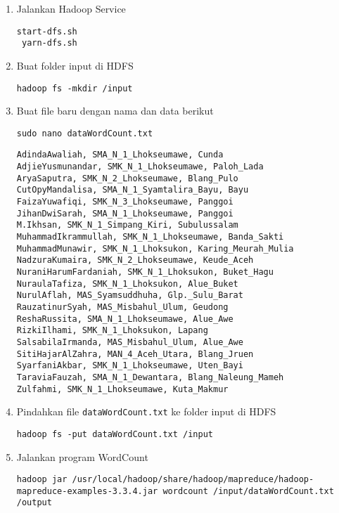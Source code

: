 \documentclass[a4paper]{tufte-handout}
\begin{document}
\begin{enumerate}
\item Jalankan Hadoop Service
\begin{lstlisting}[language=Terminal]
 start-dfs.sh
 yarn-dfs.sh
\end{lstlisting}

\item Buat folder input di HDFS
\begin{lstlisting}[language=Terminal]
 hadoop fs -mkdir /input
\end{lstlisting}

\item Buat file baru dengan nama dan data berikut
\begin{lstlisting}[language=Terminal]
 sudo nano dataWordCount.txt
\end{lstlisting}

\begin{lstlisting}[language=CSV, label={lst:data-wordcount}, caption=Data WorkCount]
AdindaAwaliah, SMA_N_1_Lhokseumawe, Cunda
AdjieYusmunandar, SMK_N_1_Lhokseumawe, Paloh_Lada
AryaSaputra, SMK_N_2_Lhokseumawe, Blang_Pulo
CutOpyMandalisa, SMA_N_1_Syamtalira_Bayu, Bayu
FaizaYuwafiqi, SMK_N_3_Lhokseumawe, Panggoi
JihanDwiSarah, SMA_N_1_Lhokseumawe, Panggoi
M.Ikhsan, SMK_N_1_Simpang_Kiri, Subulussalam
MuhammadIkrammullah, SMK_N_1_Lhokseumawe, Banda_Sakti
MuhammadMunawir, SMK_N_1_Lhoksukon, Karing_Meurah_Mulia
NadzuraKumaira, SMK_N_2_Lhokseumawe, Keude_Aceh
NuraniHarumFardaniah, SMK_N_1_Lhoksukon, Buket_Hagu
NuraulaTafiza, SMK_N_1_Lhoksukon, Alue_Buket
NurulAflah, MAS_Syamsuddhuha, Glp._Sulu_Barat
RauzatinurSyah, MAS_Misbahul_Ulum, Geudong
ReshaRussita, SMA_N_1_Lhokseumawe, Alue_Awe
RizkiIlhami, SMK_N_1_Lhoksukon, Lapang
SalsabilaIrmanda, MAS_Misbahul_Ulum, Alue_Awe
SitiHajarAlZahra, MAN_4_Aceh_Utara, Blang_Jruen
SyarfaniAkbar, SMK_N_1_Lhokseumawe, Uten_Bayi
TaraviaFauzah, SMA_N_1_Dewantara, Blang_Naleung_Mameh
Zulfahmi, SMK_N_1_Lhokseumawe, Kuta_Makmur
\end{lstlisting}

\item Pindahkan file {\tt dataWordCount.txt} ke folder input di HDFS
\begin{lstlisting}[language=Terminal]
 hadoop fs -put dataWordCount.txt /input
\end{lstlisting}

\item Jalankan program WordCount
\begin{lstlisting}[language=Terminal]
 hadoop jar /usr/local/hadoop/share/hadoop/mapreduce/hadoop-mapreduce-examples-3.3.4.jar wordcount /input/dataWordCount.txt /output
\end{lstlisting} 


\end{enumerate}
\end{document}

